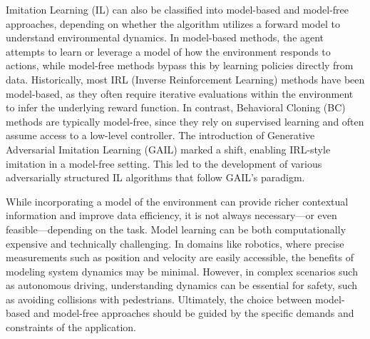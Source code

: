 Imitation Learning (IL) can also be classified into model-based and model-free approaches, depending on whether the algorithm utilizes a forward model to understand environmental dynamics. In model-based methods, the agent attempts to learn or leverage a model of how the environment responds to actions, while model-free methods bypass this by learning policies directly from data. Historically, most IRL (Inverse Reinforcement Learning) methods have been model-based, as they often require iterative evaluations within the environment to infer the underlying reward function. In contrast, Behavioral Cloning (BC) methods are typically model-free, since they rely on supervised learning and often assume access to a low-level controller. The introduction of Generative Adversarial Imitation Learning (GAIL) \autocite{ho2016generative} marked a shift, enabling IRL-style imitation in a model-free setting. This led to the development of various adversarially structured IL algorithms that follow GAIL’s paradigm.

While incorporating a model of the environment can provide richer contextual information and improve data efficiency, it is not always necessary—or even feasible—depending on the task. Model learning can be both computationally expensive and technically challenging. In domains like robotics, where precise measurements such as position and velocity are easily accessible, the benefits of modeling system dynamics may be minimal. However, in complex scenarios such as autonomous driving, understanding dynamics can be essential for safety, such as avoiding collisions with pedestrians. Ultimately, the choice between model-based and model-free approaches should be guided by the specific demands and constraints of the application.